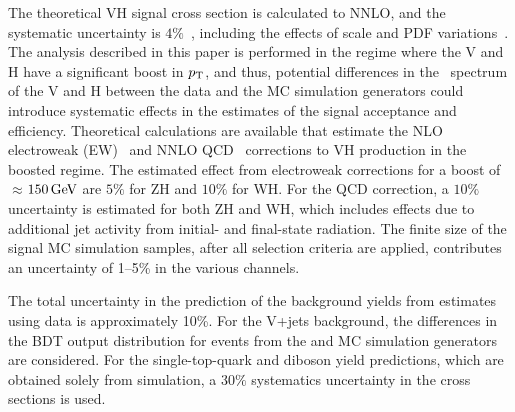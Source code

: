 \documentclass[11pt,twoside,a4paper,cmspaper,final,collab]{cms-tdr}
\begin{document}
 The theoretical VH signal cross section is
        calculated to NNLO,
       and the systematic uncertainty is $4\%$~\cite{LHCHiggsCrossSectionWorkingGroup:2011ti}, including
       the effects of scale and PDF
       variations~\cite{Botje:2011sn,Alekhin:2011sk,Lai:2010vv,Martin:2009iq,Ball:2011mu}.
       The analysis described in this paper is performed
       in the regime where the V and H have a significant boost in $p_{\mathrm{T}}$, and thus, potential differences in
       the \pt\ spectrum of the V and H between the  data and the MC
       simulation generators could introduce systematic effects in the
       estimates of the signal acceptance and efficiency.  Theoretical
       calculations are available that estimate the
       NLO electroweak (EW)~\cite{HAWK1,HAWK2,Denner:2011id} and NNLO
       QCD~\cite{Ferrera:2011bk}
       corrections to VH production in the boosted regime.  The estimated
       effect from electroweak corrections for a boost of $\approx$$150\,\text{Ge\hspace{-.08em}V}$
       are $5\%$ for ZH and $10\%$ for WH.  For the QCD correction, a $10\%$ uncertainty
       is estimated for both ZH and WH, which includes effects due
       to additional jet activity from initial- and final-state radiation. The finite size of the
       signal MC  simulation samples, after all selection criteria are
       applied, contributes an uncertainty  of 1--5\% in the various channels.

The total uncertainty in the prediction of the background yields from
estimates using data is approximately 10\%. For the V+jets background, the
differences in the BDT output distribution for events from
the \MADGRAPH and \HERWIG{++} MC simulation generators are considered.
For the single-top-quark and diboson yield predictions, which are obtained solely
from simulation, a $30\%$ systematics uncertainty in the cross
sections is used.
\end{document}
